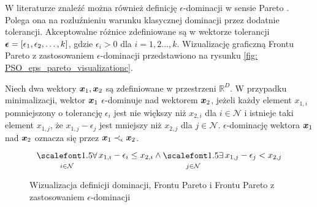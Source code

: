 W literaturze znaleźć można również definicję $\epsilon$-dominacji w sensie Pareto \parencite{Zuluaga2016}. Polega ona na rozluźnieniu warunku klasycznej dominacji przez dodatnie tolerancji. Akceptowalne różnice zdefiniowane są w wektorze tolerancji $\bm{\epsilon}=[\epsilon_1,\epsilon_2,\dots,k]$, gdzie $\epsilon_i>0$ dla $i=1,2\dots,k$. Wizualizację graficzną Frontu Pareto z zastosowaniem $\epsilon$-dominacji przedstawiono na rysunku \ref{fig: PSO_eps_pareto_visualizationc}.

\begin{definition}
	Niech dwa wektory $\bm{x}_1, \bm{x}_2$ są zdefiniowane w przestrzeni $\mathbb{R}^D$. W przypadku minimalizacji, wektor $\bm{x}_1$ $\epsilon$-dominuje nad wektorem $\bm{x}_2$, jeżeli każdy element $x_{1,i}$ pomniejszony o tolerancję $\epsilon_i$ jest nie większy niż $x_{2,i}$ dla $i\in \mathcal{N}$ i istnieje taki element $x_{1,j}$, że $x_{1,j}-\epsilon_j$ jest mniejszy niż $x_{2,j}$ dla $j\in\mathcal{N}$. $\epsilon$-dominację wektora $\bm{x}_1$ nad $\bm{x}_2$ oznacza się przez $\bm{x}_1\prec_\epsilon\bm{x}_2$.
	\begin{equation}
		\bigforall_{i\in\mathcal{N}} x_{1,i}-\epsilon_i\le x_{2,i} \land \bigexists_{j\in\mathcal{N}} x_{1,j}-\epsilon_j<x_{2,j}
	\end{equation}
\end{definition}


\begin{figure}[hbt!]
	\centering
	\captionsetup{justification=centering}
	\caption{Wizualizacja definicji dominacji, Frontu Pareto i Frontu Pareto z zastosowaniem $\epsilon$-dominacji}
	\label{fig: PSO_pareto_visualization}
\end{figure}

